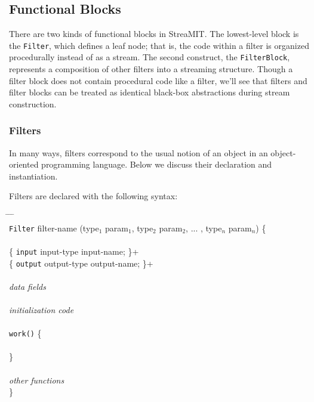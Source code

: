 \subsection{Functional Blocks}
\protect\label{sec:blocks}

There are two kinds of functional blocks in StreaMIT.  The
lowest-level block is the {\tt Filter}, which defines a leaf node;
that is, the code within a filter is organized procedurally instead of
as a stream.  The second construct, the {\tt FilterBlock}, represents
a composition of other filters into a streaming structure.  Though a
filter block does not contain procedural code like a filter, we'll see
that filters and filter blocks can be treated as identical black-box
abstractions during stream construction.

\subsubsection{Filters}

In many ways, filters correspond to the usual notion of an object in
an object-oriented programming language.  Below we discuss their
declaration and instantiation.

\medskip
{}
\medskip

Filters are declared with the following syntax:

\begin{tabbing}
\hspace{0.2in} \= \hspace{0.2in} \= \hspace{0.2in} \= \hspace{0.2in} \= \\

{\tt Filter} filter-name (type$_1$ param$_1$, type$_2$ param$_2$,
... , type$_n$ param$_n$) \{ \\ \\

\> \{ {\tt input} input-type input-name; \}+ \\
\> \{ {\tt output} output-type output-name; \}+ \\ \\

\> {\it data fields} \\ \\

\> {\it initialization code} \\ \\

\> {\tt work()} \{ \\ \\
\> \} \\ \\

\> {\it other functions} \\

\}
\end{tabbing}

